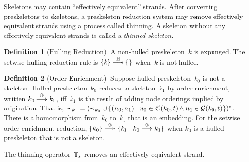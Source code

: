 \documentclass[12pt]{report}
\theoremstyle{definition}
\newtheorem{defn}{Definition}[chapter]
\begin{document}
Skeletons may contain ``effectively equivalent'' strands.  After
converting preskeletons to skeletons, a preskeleton reduction system
may remove effectively equivalent strands using a process called
thinning.  A skeleton without any effectively
equivalent strands is called a \emph{thinned skeleton}.

\begin{defn}[Hulling Reduction]\label{def:hulling}
A non-hulled preskeleton~$k$ is expunged.  The setwise hulling
reduction rule is $\{k\}\setreduction{\ops{H}}\{\}$ when~$k$ is not
hulled.
\end{defn}

\begin{defn}[Order Enrichment]
Suppose hulled preskeleton~$k_0$ is not a skeleton.  Hulled
preskeleton~$k_0$ reduces to skeleton~$k_1$ by order enrichment, written
$k_0\stackrel{\mathbb O}{\longrightarrow}k_1$, iff~$k_1$ is the result of adding node
orderings implied by origination.  That is,
$\mathbin{\prec_{k_1}}= (\mathbin{\prec_{k_0}}\cup\{(n_0,n_1)\mid n_0\in\mathcal{O}(k_0,t)\land
n_1\in\mathcal{G}(k_0,t)\})^\ast$.
There is a homomorphism from~$k_0$ to~$k_1$ that is an embedding.  For
the setwise order enrichment reduction,
$\{k_0\}\setreduction{\ops{O}}\{k_1\mid k_0\reduction{\ops{O}}k_1\}$
when $k_0$ is a hulled preskeleton that is not a skeleton.
\end{defn}

The thinning operator~$\mathbb T_s$ removes an effectively equivalent strand.
\end{document}
